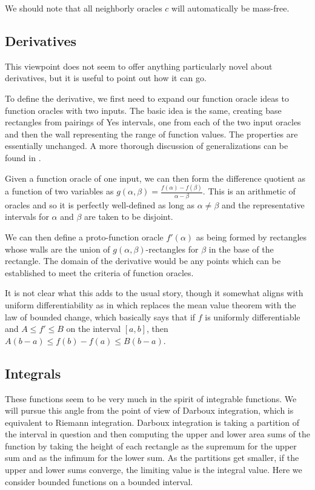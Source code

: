 \documentclass[12pt]{article}
\theoremstyle{remark}
\begin{document}
We should note that all neighborly oracles $c$ will automatically be mass-free. 

\subsection{Derivatives}

This viewpoint does not seem to offer anything particularly novel about derivatives, but it is useful to point out how it can go. 

To define the derivative, we first need to expand our function oracle ideas to function oracles with two inputs. The basic idea is the same, creating base rectangles from pairings of Yes intervals, one from each of the two input oracles and then the wall representing the range of function values. The properties are essentially unchanged. A more thorough discussion of generalizations can be found in \cite{taylor23metric}.

Given a function oracle of one input, we can then form the difference quotient as a function of two variables as $g(\alpha, \beta) = \frac{ f(\alpha) - f(\beta) }{\alpha - \beta}$. This is an arithmetic of oracles and so it is perfectly well-defined as long as $\alpha \neq \beta$ and the representative intervals for $\alpha$ and $\beta$ are taken to be disjoint. 

We can then define a proto-function oracle $f'(\alpha)$ as being formed by rectangles whose walls are the union of $g(\alpha, \beta)$-rectangles for $\beta$ in the base of the rectangle. The domain of the derivative would be any points which can be established to meet the criteria of function oracles. 

It is not clear what this adds to the usual story, though it somewhat aligns with uniform differentiability as in \cite{BriStol} which replaces the mean value theorem with the law of bounded change, which basically says that if $f$ is uniformly differentiable and $A \leq f' \leq B$ on the interval $[a,b]$, then $A(b-a) \leq f(b)-f(a) \leq B(b-a)$.  

\subsection{Integrals}\label{sec:int}

These functions seem to be very much in the spirit of integrable functions. We will pursue this angle from the point of view of Darboux integration, which is equivalent to Riemann integration. Darboux integration is taking a partition of the interval in question and then computing the upper and lower area sums of the function by taking the height of each rectangle as the supremum for the upper sum and as the infimum for the lower sum. As the partitions get smaller, if the upper and lower sums converge, the limiting value is the integral value. Here we consider bounded functions on a bounded interval. 
\end{document}
